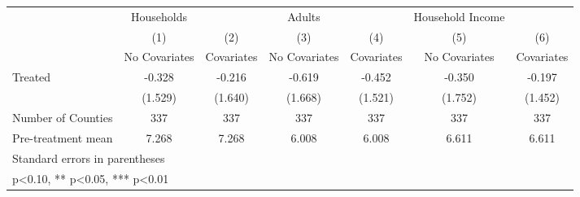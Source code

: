 {
\def\sym#1{\ifmmode^{#1}\else\(^{#1}\)\fi}
\begin{tabular}{l*{6}{c}}
\hline\hline
            &  Households   &               &      Adults   &               &Household Income   &               \\
            &\multicolumn{1}{c}{(1)}&\multicolumn{1}{c}{(2)}&\multicolumn{1}{c}{(3)}&\multicolumn{1}{c}{(4)}&\multicolumn{1}{c}{(5)}&\multicolumn{1}{c}{(6)}\\
            &\multicolumn{1}{c}{No Covariates}&\multicolumn{1}{c}{Covariates}&\multicolumn{1}{c}{No Covariates}&\multicolumn{1}{c}{Covariates}&\multicolumn{1}{c}{No Covariates}&\multicolumn{1}{c}{Covariates}\\
\hline
Treated     &      -0.328   &      -0.216   &      -0.619   &      -0.452   &      -0.350   &      -0.197   \\
            &     (1.529)   &     (1.640)   &     (1.668)   &     (1.521)   &     (1.752)   &     (1.452)   \\
\hline
Number of Counties&         337   &         337   &         337   &         337   &         337   &         337   \\
Pre-treatment mean&       7.268   &       7.268   &       6.008   &       6.008   &       6.611   &       6.611   \\
\hline\hline
\multicolumn{7}{l}{\footnotesize Standard errors in parentheses}\\
\multicolumn{7}{l}{\footnotesize * p<0.10, ** p<0.05, *** p<0.01}\\
\end{tabular}
}
